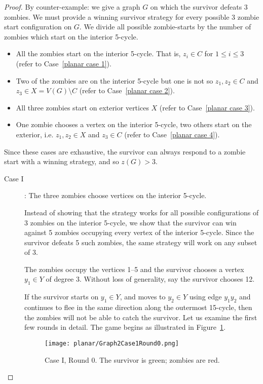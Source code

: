 \begin{proof}
  By counter-example: we give a graph $G$ on which the survivor defeats 3 zombies.
  We must provide a winning survivor strategy for every possible 3 zombie start configuration on $G$. We divide all possible zombie-starts by the number of zombies which start on the
  interior 5-cycle.

  \begin{itemize}
  \item All the zombies start on the interior 5-cycle. That is, $z_i \in C$ for $1 \leq i \leq 3$ (refer to Case~\ref{planar case 1}).
  \item Two of the zombies are on the interior 5-cycle but one is not so $z_1, z_2 \in C$ and $z_3 \in X = V(G) \setminus C$ (refer to Case~\ref{planar case 2}).
  \item All three zombies start on exterior vertices $X$ (refer to Case~\ref{planar case 3}).
  \item One zombie chooses a vertex on the interior 5-cycle, two others start on the exterior, i.e. $z_1, z_2 \in X$ and $z_3 \in C$ (refer to Case~\ref{planar case 4}).
  \end{itemize}

  Since these cases are exhaustive, the survivor can always respond to a zombie start with a winning
  strategy, and so $z(G) > 3$.

  \begin{description}
\item[Case I \label{planar case 1}]: The three zombies choose vertices on the interior 5-cycle.

Instead of showing that the strategy works for all possible configurations of 3 zombies on the interior 5-cycle,
we show that the survivor can win against 5 zombies occupying every vertex of the interior 5-cycle.
Since the survivor defeats 5 such zombies, the same strategy will work on any subset of 3.

The zombies occupy the vertices 1--5 and the survivor chooses a vertex $y_1 \in Y$ of degree 3.
Without loss of generality, say the survivor chooses 12.

If the survivor starts on $y_1 \in Y$, and moves to $y_2\in Y$ using edge $y_1y_2$ and continues to flee in the same direction along the outermost 15-cycle, then the zombies will not be able to catch the survivor. Let us examine the first few rounds in detail. The game begins as illustrated in Figure~\ref{fig:planarG2C1R0}.

\begin{figure}
\centering
\texttt{[image: planar/Graph2Case1Round0.png]}
\caption{Case I, Round 0. The survivor is green; zombies are red.\label{fig:planarG2C1R0}}
\end{figure}


\end{description}
\end{proof}
